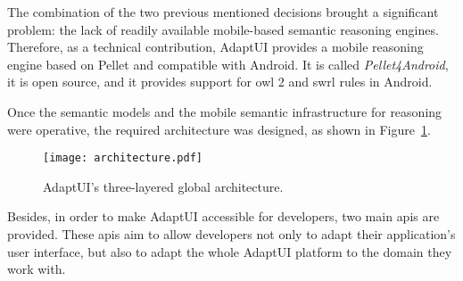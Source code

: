 The combination of the two previous mentioned decisions brought a significant
problem: the lack of readily available mobile-based semantic reasoning engines. 
Therefore, as a technical contribution, AdaptUI provides a mobile reasoning engine 
based on Pellet and compatible with Android. It is called \textit{Pellet4Android}, 
it is open source, and it provides support for \ac{owl} 2 and \ac{swrl} rules in 
Android.

Once the semantic models and the mobile semantic infrastructure for reasoning
were operative, the required architecture was designed, as shown in Figure~\ref{fig:architecture_discussion}.

\begin{figure}[H]
\centering
\texttt{[image: architecture.pdf]}
\caption{AdaptUI's three-layered global architecture.}
\label{fig:architecture_discussion}
\end{figure}

Besides, in order to make AdaptUI accessible for developers, two main \acp{api}
are provided. These \acp{api} aim to allow developers not only to adapt their
application's user interface, but also to adapt the whole AdaptUI platform
to the domain they work with.


